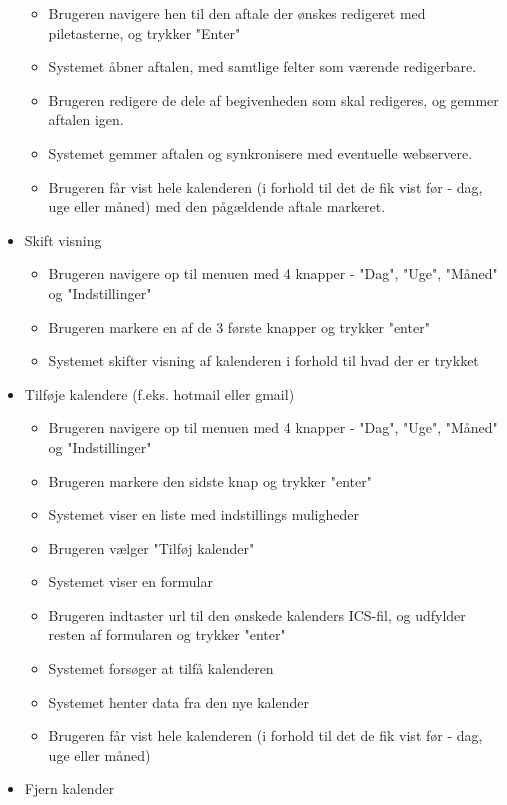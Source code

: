 \documentclass{article}
\begin{document}
\begin{itemize}
\begin{itemize}
   	\item Brugeren navigere hen til den aftale der ønskes redigeret med piletasterne, og trykker "Enter"
   	\item Systemet åbner aftalen, med samtlige felter som værende redigerbare.
   	\item Brugeren redigere de dele af begivenheden som skal redigeres, og gemmer aftalen igen.
   	\item Systemet gemmer aftalen og synkronisere med eventuelle webservere.
   	\item Brugeren får vist hele kalenderen (i forhold til det de fik vist før - dag, uge eller måned) med den pågældende aftale markeret.
   	\end{itemize}
   
   \item Skift visning
   \begin{itemize}
   \item Brugeren navigere op til menuen med 4 knapper - "Dag", "Uge", "Måned" og "Indstillinger"
   \item Brugeren markere en af de 3 første knapper og trykker "enter"
   \item Systemet skifter visning af kalenderen i forhold til hvad der er trykket
   \end{itemize}
   \item Tilføje kalendere (f.eks. hotmail eller gmail)
   \begin{itemize}
   \item Brugeren navigere op til menuen med 4 knapper - "Dag", "Uge", "Måned" og "Indstillinger"
   \item Brugeren markere den sidste knap og trykker "enter"
   \item Systemet viser en liste med indstillings muligheder
   \item Brugeren vælger "Tilføj kalender"
   \item Systemet viser en formular
   \item Brugeren indtaster url til den ønskede kalenders ICS-fil, og udfylder resten af formularen og trykker "enter"
   \item Systemet forsøger at tilfå kalenderen
   \item Systemet henter data fra den nye kalender
   \item Brugeren får vist hele kalenderen (i forhold til det de fik vist før - dag, uge eller måned)
   \end{itemize}
   \item Fjern kalender

\end{itemize}
\end{document}
